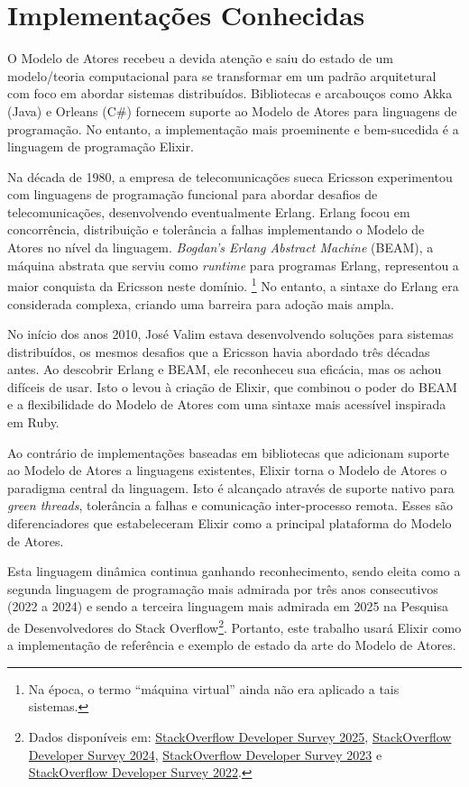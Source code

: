 \section{Implementações Conhecidas}

O Modelo de Atores recebeu a devida atenção e saiu do estado de um modelo/teoria computacional para se transformar em um padrão arquitetural com foco em abordar sistemas distribuídos. Bibliotecas e arcabouços como Akka (Java) e Orleans (C\#) fornecem suporte ao Modelo de Atores para linguagens de programação. No entanto, a implementação mais proeminente e bem-sucedida é a linguagem de programação Elixir.

Na década de 1980, a empresa de telecomunicações sueca Ericsson experimentou com linguagens de programação funcional para abordar desafios de telecomunicações, desenvolvendo eventualmente Erlang. Erlang focou em concorrência, distribuição e tolerância a falhas implementando o Modelo de Atores no nível da linguagem. \textit{Bogdan's Erlang Abstract Machine} (BEAM), a máquina abstrata que serviu como \emph{runtime} para programas Erlang, representou a maior conquista da Ericsson neste domínio.
\footnote{Na época, o termo ``máquina virtual'' ainda não era aplicado a tais sistemas.}
No entanto, a sintaxe do Erlang era considerada complexa, criando uma barreira para adoção mais ampla.

No início dos anos 2010, José Valim estava desenvolvendo soluções para sistemas distribuídos, os mesmos desafios que a Ericsson havia abordado três décadas antes. Ao descobrir Erlang e BEAM, ele reconheceu sua eficácia, mas os achou difíceis de usar. Isto o levou à criação de Elixir, que combinou o poder do BEAM e a flexibilidade do Modelo de Atores com uma sintaxe mais acessível inspirada em Ruby.

Ao contrário de implementações baseadas em bibliotecas que adicionam suporte ao Modelo de Atores a linguagens existentes, Elixir torna o Modelo de Atores o paradigma central da linguagem. Isto é alcançado através de suporte nativo para \emph{green threads}, tolerância a falhas e comunicação inter-processo remota. Esses são diferenciadores que estabeleceram Elixir como a principal plataforma do Modelo de Atores.

Esta linguagem dinâmica continua ganhando reconhecimento, sendo eleita como a segunda linguagem de programação mais admirada por três anos consecutivos (2022 a 2024) e sendo a terceira linguagem mais admirada em 2025 na Pesquisa de Desenvolvedores do Stack Overflow\footnote{Dados disponíveis em: \href{https://survey.stackoverflow.co/2025/technology\#2-programming-scripting-and-markup-languages}{StackOverflow Developer Survey 2025}, \href{https://survey.stackoverflow.co/2024/technology\#2-programming-scripting-and-markup-languages}{StackOverflow Developer Survey 2024}, \href{https://survey.stackoverflow.co/2023/\#section-admired-and-desired-programming-scripting-and-markup-languages}{StackOverflow Developer Survey 2023} e \href{https://survey.stackoverflow.co/2022/\#section-most-loved-dreaded-and-wanted-programming-scripting-and-markup-languages}{StackOverflow Developer Survey 2022}. }. Portanto, este trabalho usará Elixir como a implementação de referência e exemplo de estado da arte do Modelo de Atores.

